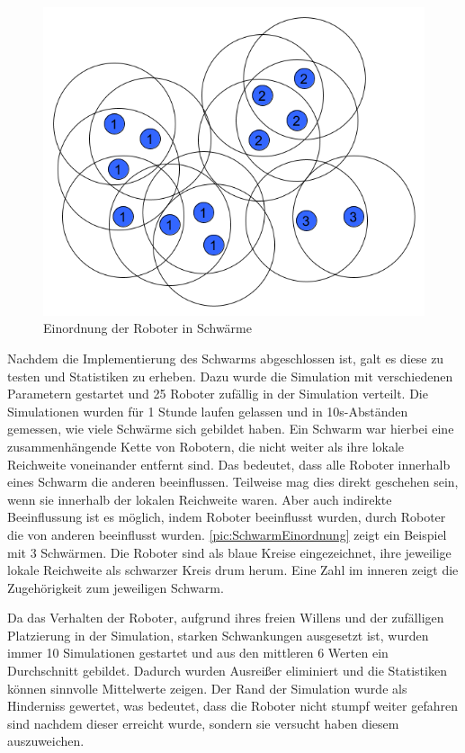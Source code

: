 \begin{figure}
	\includegraphics[width=\pictureWidth,keepaspectratio]{graphics/SchwarmEinordnung.png}
	\caption{Einordnung der Roboter in Schwärme}
	\label{pic:SchwarmEinordnung}
\end{figure}

Nachdem die Implementierung des Schwarms abgeschlossen ist, galt es diese zu testen und Statistiken zu erheben. Dazu wurde die Simulation mit verschiedenen Parametern gestartet und 25 Roboter zufällig in der Simulation verteilt. Die Simulationen wurden für 1 Stunde laufen gelassen und in 10s-Abständen gemessen, wie viele Schwärme sich gebildet haben.
Ein Schwarm war hierbei eine zusammenhängende Kette von Robotern, die nicht weiter als ihre lokale Reichweite voneinander entfernt sind. Das bedeutet, dass alle Roboter innerhalb eines Schwarm die anderen beeinflussen. Teilweise mag dies direkt geschehen sein, wenn sie innerhalb der lokalen Reichweite waren. Aber auch indirekte Beeinflussung ist es möglich, indem Roboter beeinflusst wurden, durch Roboter die von anderen beeinflusst wurden. \autoref{pic:SchwarmEinordnung} zeigt ein Beispiel mit 3 Schwärmen. Die Roboter sind als blaue Kreise eingezeichnet, ihre jeweilige lokale Reichweite als schwarzer Kreis drum herum. Eine Zahl im inneren zeigt die Zugehörigkeit zum jeweiligen Schwarm.

Da das Verhalten der Roboter, aufgrund ihres freien Willens und der zufälligen Platzierung in der Simulation, starken Schwankungen ausgesetzt ist, wurden immer 10 Simulationen gestartet und aus den mittleren 6 Werten ein Durchschnitt gebildet. Dadurch wurden Ausreißer eliminiert und die Statistiken können sinnvolle Mittelwerte zeigen. Der Rand der Simulation wurde als Hinderniss gewertet, was bedeutet, dass die Roboter nicht stumpf weiter gefahren sind nachdem dieser erreicht wurde, sondern sie versucht haben diesem auszuweichen.

